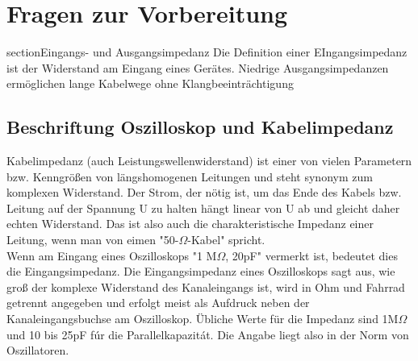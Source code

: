 

\chapter{Fragen zur Vorbereitung}
\label{chap:fvz}





section{Eingangs- und Ausgangsimpedanz}
Die Definition einer EIngangsimpedanz ist der Widerstand am Eingang eines Gerätes. Niedrige
Ausgangsimpedanzen ermöglichen lange Kabelwege ohne Klangbeeinträchtigung\\

\section{Beschriftung Oszilloskop und Kabelimpedanz}
Kabelimpedanz (auch Leistungswellenwiderstand) ist einer von vielen Parametern bzw.
Kenngrößen von längshomogenen Leitungen und steht synonym zum komplexen Widerstand.
Der Strom, der n\"otig ist, um das Ende des Kabels bzw. Leitung auf der Spannung U zu halten h\"angt linear von U ab und gleicht daher echten Widerstand. Das ist also auch die charakteristische Impedanz einer Leitung, wenn man von eimen "50-$\Omega$-Kabel" spricht.\\

Wenn am Eingang eines Oszilloskops "1 M$\Omega$, 20pF" vermerkt ist, bedeutet dies die Eingangsimpedanz. Die Eingangsimpedanz eines Oszilloskops sagt aus, wie gro\ss{} der komplexe Widerstand des Kanaleingangs ist, wird in Ohm und Fahrrad getrennt angegeben und erfolgt meist als Aufdruck neben der Kanaleingangsbuchse am Oszilloskop. \"Ubliche Werte f\"ur die Impedanz sind 1M$\Omega$ und 10 bis 25pF f\'ur die Parallelkapazit\'at. Die Angabe liegt also in der Norm von Oszillatoren. 

